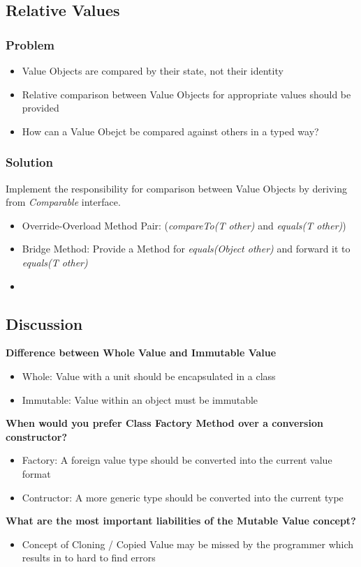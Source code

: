 \subsection{Relative Values}
\subsubsection{Problem}
\begin{itemize}
    \item Value Objects are compared by their state, not their identity
    \item Relative comparison between Value Objects for appropriate values should be provided
    \item How can a Value Obejct be compared against others in a typed way?
\end{itemize}
\subsubsection{Solution}
Implement the responsibility for comparison between Value Objects by deriving from \textit{Comparable} interface.
\begin{itemize}
    \item Override-Overload Method Pair: (\textit{compareTo(T other)} and \textit{equals(T other)})
    \item Bridge Method: Provide a Method for \textit{equals(Object other)} and forward it to \textit{equals(T other)}
    \item 
\end{itemize}

\subsection{Discussion}
\textbf{Difference between Whole Value and Immutable Value}
\begin{itemize}
    \item Whole: Value with a unit should be encapsulated in a class
    \item Immutable: Value within an object must be immutable
\end{itemize}
\textbf{When would you prefer Class Factory Method over a conversion constructor?}
\begin{itemize}
    \item Factory: A foreign value type should be converted into the current value format
    \item Contructor: A more generic type should be converted into the current type
\end{itemize}
\textbf{What are the most important liabilities of the Mutable Value concept?}
\begin{itemize}
    \item Concept of Cloning / Copied Value may be missed by the programmer which results in to hard to find errors
\end{itemize}